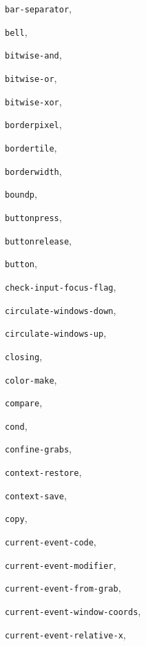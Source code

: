\begin{theindex}
\item {\tt bar-separator}, {\bf\pageref{bar-separator}}
\item {\tt bell}, {\bf\pageref{bell}}
\item {\tt bitwise-and}, {\bf\pageref{bitwise-and}}
\item {\tt bitwise-or}, {\bf\pageref{bitwise-or}}
\item {\tt bitwise-xor}, {\bf\pageref{bitwise-xor}}
\item {\tt borderpixel}, {\bf\pageref{borderpixel}}
\item {\tt bordertile}, {\bf\pageref{bordertile}}
\item {\tt borderwidth}, {\bf\pageref{borderwidth}}
\item {\tt boundp}, {\bf\pageref{boundp}}
\item {\tt buttonpress}, {\bf\pageref{buttonpress}}
\item {\tt buttonrelease}, {\bf\pageref{buttonrelease}}
\item {\tt button}, {\bf\pageref{button}}
\item {\tt check-input-focus-flag}, {\bf\pageref{check-input-focus-flag}}
\item {\tt circulate-windows-down}, {\bf\pageref{circulate-windows-down}}
\item {\tt circulate-windows-up}, {\bf\pageref{circulate-windows-up}}
\item {\tt closing}, {\bf\pageref{closing}}
\item {\tt color-make}, {\bf\pageref{color-make}}
\item {\tt compare}, {\bf\pageref{compare}}
\item {\tt cond}, {\bf\pageref{cond}}
\item {\tt confine-grabs}, {\bf\pageref{confine-grabs}}
\item {\tt context-restore}, {\bf\pageref{context-restore}}
\item {\tt context-save}, {\bf\pageref{context-save}}
\item {\tt copy}, {\bf\pageref{copy}}
\item {\tt current-event-code}, {\bf\pageref{current-event-code}}
\item {\tt current-event-modifier}, {\bf\pageref{current-event-modifier}}
\item {\tt current-event-from-grab}, {\bf\pageref{current-event-from-grab}}
\item {\tt current-event-window-coords}, {\bf\pageref{current-event-window-coords}}
\item {\tt current-event-relative-x}, {\bf\pageref{current-event-relative-x}}

\end{theindex}
